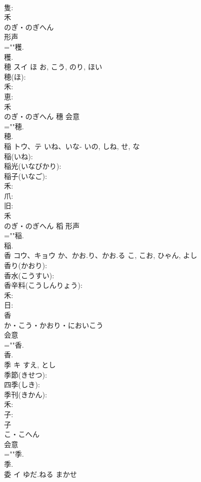 \documentclass[8pt]{extreport}
\begin{document}
\begin{CJK}{UTF8}{min}
\\	隻: 
\\	禾	
\\	のぎ・のぎへん	
\\	形声 
\\	=""穫.
\\	穫.
\\	穂	スイ	ほ	お, こう, のり, ほい	
\\	穂(ほ): 
\\	禾: 
\\	恵: 
\\	禾	
\\	のぎ・のぎへん	穗	会意 
\\	=""穂.
\\	穂.
\\	稲	トウ、テ	いね、いな-	いの, しね, せ, な	
\\	稲(いね): 
\\	稲光(いなびかり): 
\\	稲子(いなご): 
\\	禾: 
\\	爪: 
\\	旧: 
\\	禾	
\\	のぎ・のぎへん	稻	形声 
\\	=""稲.
\\	稲.
\\	香	コウ、キョウ	か、かお.り、かお.る	こ, こお, ひゃん, よし	
\\	香り(かおり): 
\\	香水(こうすい): 
\\	香辛料(こうしんりょう): 
\\	禾: 
\\	日: 
\\	香	
\\	か・こう・かおり・においこう	
\\	会意 
\\	=""香.
\\	香.
\\	季	キ		すえ, とし	
\\	季節(きせつ): 
\\	四季(しき): 
\\	季刊(きかん): 
\\	禾: 
\\	子: 
\\	子	
\\	こ・こへん	
\\	会意 
\\	=""季.
\\	季.
\\	委	イ	ゆだ.ねる	まかせ	

\end{CJK}
\end{document}
